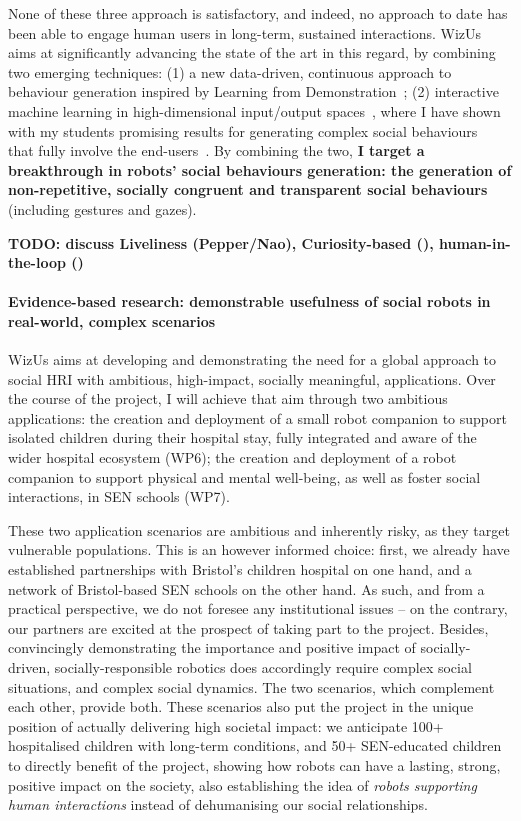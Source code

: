 \documentclass[11pt]{report}
\newcommand{\project}{WizUs\xspace}
\newcommand{\TODO}[1]{{\color{red}\textbf{TODO: #1}}}
\begin{document}
None of these three approach is satisfactory, and indeed, no approach to date
has been able to engage human users in long-term, sustained interactions.
\project aims at significantly advancing the state of the art in this regard, by
combining two emerging techniques: (1) a new data-driven, continuous approach to
behaviour generation inspired by Learning from
Demonstration~\cite{citationneeded}; (2) interactive machine learning in
high-dimensional input/output spaces~\cite{senft2020woz}, where I have shown
with my students promising results for generating complex social
behaviours~\cite{senft2019teaching, winkle2020coach} that fully involve the
end-users~\cite{winkle2020methodology}. By combining the two, \textbf{I target a
breakthrough in robots' social behaviours generation: the generation of
non-repetitive, socially congruent and transparent social
behaviours} (including gestures and gazes).

\TODO{discuss Liveliness (Pepper/Nao), Curiosity-based (\cite{kaplan}),
human-in-the-loop (\cite{senft, winkle})}

\paragraph{Evidence-based research: demonstrable usefulness of social robots in
real-world, complex scenarios}

\project aims at developing and demonstrating the need for a global approach to
social HRI with ambitious, high-impact, socially meaningful, applications. Over
the course of the project, I will achieve that aim through two ambitious
applications: the creation and deployment of a small robot companion to support
isolated children during their hospital stay, fully integrated and aware of the
wider hospital ecosystem (WP6); the creation and deployment of a robot companion to
support physical and mental well-being, as well as foster social interactions,
in SEN schools (WP7).

These two application scenarios are ambitious and inherently risky, as they
target vulnerable populations. This is an however informed choice: first, we
already have established partnerships with Bristol's children hospital on one
hand, and a network of Bristol-based SEN schools on the other hand. As such, and
from a practical perspective, we do not foresee any institutional issues -- on
the contrary, our partners are excited at the prospect of taking part to the
project. Besides, convincingly demonstrating the importance and positive impact
of socially-driven, socially-responsible robotics does accordingly require
complex social situations, and complex social dynamics. The two scenarios, which
complement each other, provide both. These scenarios also put the project in the
unique position of actually delivering high societal impact: we anticipate 100+
hospitalised children with long-term conditions, and 50+ SEN-educated children
to directly benefit of the project, showing how robots can have a lasting,
strong, positive impact on the society, also establishing the idea of
\emph{robots supporting human interactions} instead of dehumanising our social
relationships.
\end{document}

